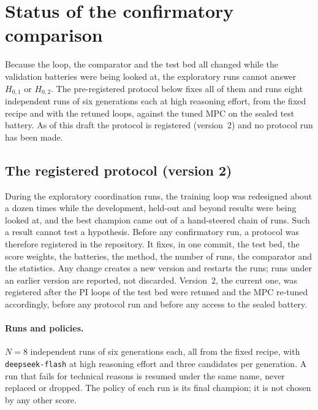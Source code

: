 \section{Status of the confirmatory comparison}
\label{sec:coord-status}
Because the loop, the comparator and the test bed all changed while the
validation batteries were being looked at, the exploratory runs cannot
answer $H_{0,1}$ or $H_{0,2}$. The pre-registered protocol below fixes all of them and runs eight independent runs
of six generations each at high reasoning effort, from the fixed recipe and
with the retuned loops, against the tuned MPC on the sealed test battery.
As of this draft the protocol is registered (version~2) and no protocol run
has been made.
\label{sec:coord-protocol}

\subsection*{The registered protocol (version 2)}
During the exploratory coordination runs, the training loop was redesigned
about a dozen times while the development, held-out and beyond results were
being looked at, and the best champion came out of a hand-steered chain of
runs. Such a result cannot test a hypothesis. Before any confirmatory run,
a protocol was therefore registered in the repository. It fixes, in one
commit, the test bed, the score weights, the batteries, the method, the
number of runs, the comparator and the statistics. Any change creates a new
version and restarts the runs; runs under an earlier version are reported,
not discarded. Version~2, the current one, was registered after the PI loops
of the test bed were retuned and the MPC re-tuned accordingly, before any
protocol run and before any access to the sealed battery.

\paragraph{Runs and policies.} $N = 8$ independent runs of six generations
each, all from the fixed recipe, with \texttt{deepseek-flash} at high
reasoning effort and three candidates per generation. A run that fails for
technical reasons is resumed under the same name, never replaced or dropped.
The policy of each run is its final champion; it is not chosen by any other
score.


